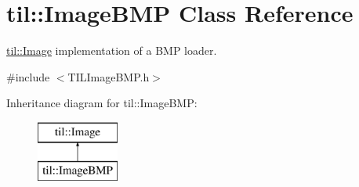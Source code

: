 \hypertarget{classtil_1_1_image_b_m_p}{
\section{til::ImageBMP Class Reference}
\label{classtil_1_1_image_b_m_p}
}


\hyperlink{classtil_1_1_image}{til::Image} implementation of a BMP loader.  




{\ttfamily \#include $<$TILImageBMP.h$>$}

Inheritance diagram for til::ImageBMP:\begin{figure}[H]
\begin{center}
\leavevmode
\includegraphics[height=2.000000cm]{classtil_1_1_image_b_m_p}
\end{center}
\end{figure}

